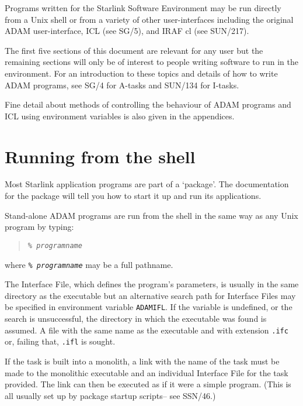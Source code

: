 \documentclass[twoside,11pt]{article}
\newcommand{\htmladdnormallink}[2]{#1}
\newcommand{\latex}[1]{#1}
\newcommand{\xref}[3]{#1}
\newcommand{\xlabel}[1]{}
\renewcommand{\_}{\texttt{\symbol{95}}}
\newcommand{\IRAFURL}{http://www.starlink.rl.ac.uk/iraf/web/iraf-homepage.html}
\begin{document}
Programs written for the Starlink Software Environment may be run directly 
from a Unix shell or from a variety of other user-interfaces including 
the original ADAM user-interface, 
\xref{ICL}{sg5}{abstract}\latex{ (see SG/5)},
and
\htmladdnormallink{IRAF}{\IRAFURL} 
cl (see
\xref{SUN/217}{sun217}{}).

The first five sections of this document are relevant for any user but the
remaining sections will only be of interest to people writing software to run
in the environment.
For an introduction to these topics and details of how to write ADAM 
programs, see 
\xref{SG/4}{sg4}{} 
for A-tasks and 
\xref{SUN/134}{sun134}{}
for I-tasks.

Fine detail about methods of controlling the behaviour of ADAM
programs and ICL using environment variables is also
given in the appendices.

\section{\xlabel{running_from_the_shell}\label{running_from_the_shell}Running from the shell}
Most Starlink application programs are part of a `package'. The documentation
for the package will tell you how to start it up and run its applications.

Stand-alone ADAM programs are run from the shell in the same way as any Unix
program by typing:
\small
\begin{quote} 
\texttt{\% \textit{program\_name}}
\end{quote}
\normalsize
where \texttt{\% \textit{program\_name}} may be a full pathname.

The Interface File, which defines the program's parameters, is usually in the 
same directory as the executable but an alternative search path for Interface 
Files may be specified in environment variable \texttt{ADAM\_IFL}.
If the variable is undefined, or the search is unsuccessful, the directory in
which the executable was found is assumed.
A file with the same name as the executable and with extension 
\texttt{.ifc} or, failing that, \texttt{.ifl} is sought.

If the task is built into a monolith, a link with the name of the task must be
made to the monolithic executable and an individual Interface File for the task
provided. The link can then be executed as if it were a simple program.
(This is all usually set up by 
\xref{package startup
scripts}{ssn64}{shell_package_startup_scripts}\latex{-- see SSN/46}.)
\end{document}
